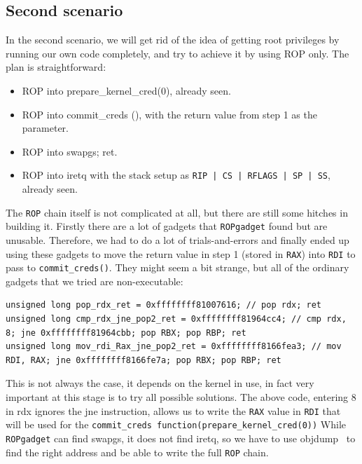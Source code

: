 \documentclass{masterthesis}
\begin{document}
\subsection{Second scenario}
\label{subsect:second scenario}
In the second scenario, we will get rid of the idea of getting root privileges by running our own code completely, and try to achieve it by using ROP only. The plan is straightforward:
\begin{itemize}
\item ROP into prepare\_kernel\_cred(0), already seen.
\item ROP into commit\_creds (), with the return value from step 1 as the parameter.
\item ROP into swapgs; ret.
\item ROP into iretq with the stack setup as \texttt{RIP | CS | RFLAGS | SP | SS}, already seen.
\end{itemize}
The \texttt{ROP} chain itself is not complicated at all, but there are still some hitches in building it. Firstly there are a lot of gadgets that \texttt{ROPgadget} found but are unusable. Therefore, we had to do a lot of trials-and-errors and finally ended up using these gadgets to move the return value in step 1 (stored in \texttt{RAX}) into \texttt{RDI} to pass to \texttt{commit\_creds()}. They might seem a bit strange, but all of the ordinary gadgets that we tried are non-executable:
\begin{lstlisting}
unsigned long pop_rdx_ret = 0xffffffff81007616; // pop rdx; ret
unsigned long cmp_rdx_jne_pop2_ret = 0xffffffff81964cc4; // cmp rdx, 8; jne 0xffffffff81964cbb; pop RBX; pop RBP; ret
unsigned long mov_rdi_Rax_jne_pop2_ret = 0xffffffff8166fea3; // mov RDI, RAX; jne 0xffffffff8166fe7a; pop RBX; pop RBP; ret
\end{lstlisting}
This is not always the case, it depends on the kernel in use, in fact very important at this stage is to try all possible solutions.
The above code, entering 8 in rdx ignores the jne instruction, allows us to write the \texttt{RAX} value in \texttt{RDI} that will be used for the \texttt{commit\_creds function(prepare\_kernel\_cred(0))}
While \texttt{ROPgadget} can find swapgs, it does not find iretq, so we have to use objdump~\cite{weatherspoonassemblers} to find the right address and be able to write the full \texttt{ROP} chain.
\end{document}
